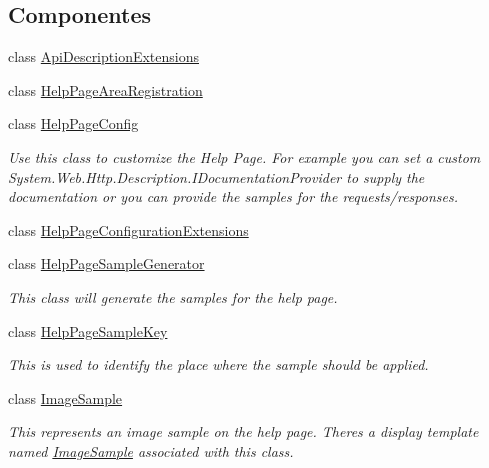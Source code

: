 \subsection*{Componentes}
\begin{DoxyCompactItemize}
\item 
class \hyperlink{classApi3Layers_1_1Areas_1_1HelpPage_1_1ApiDescriptionExtensions}{Api\+Description\+Extensions}
\item 
class \hyperlink{classApi3Layers_1_1Areas_1_1HelpPage_1_1HelpPageAreaRegistration}{Help\+Page\+Area\+Registration}
\item 
class \hyperlink{classApi3Layers_1_1Areas_1_1HelpPage_1_1HelpPageConfig}{Help\+Page\+Config}
\begin{DoxyCompactList}\small\item\em Use this class to customize the Help Page. For example you can set a custom System.\+Web.\+Http.\+Description.\+I\+Documentation\+Provider to supply the documentation or you can provide the samples for the requests/responses. \end{DoxyCompactList}\item 
class \hyperlink{classApi3Layers_1_1Areas_1_1HelpPage_1_1HelpPageConfigurationExtensions}{Help\+Page\+Configuration\+Extensions}
\item 
class \hyperlink{classApi3Layers_1_1Areas_1_1HelpPage_1_1HelpPageSampleGenerator}{Help\+Page\+Sample\+Generator}
\begin{DoxyCompactList}\small\item\em This class will generate the samples for the help page. \end{DoxyCompactList}\item 
class \hyperlink{classApi3Layers_1_1Areas_1_1HelpPage_1_1HelpPageSampleKey}{Help\+Page\+Sample\+Key}
\begin{DoxyCompactList}\small\item\em This is used to identify the place where the sample should be applied. \end{DoxyCompactList}\item 
class \hyperlink{classApi3Layers_1_1Areas_1_1HelpPage_1_1ImageSample}{Image\+Sample}
\begin{DoxyCompactList}\small\item\em This represents an image sample on the help page. There\textquotesingle{}s a display template named \hyperlink{classApi3Layers_1_1Areas_1_1HelpPage_1_1ImageSample}{Image\+Sample} associated with this class. \end{DoxyCompactList}\item 

\end{DoxyCompactItemize}
